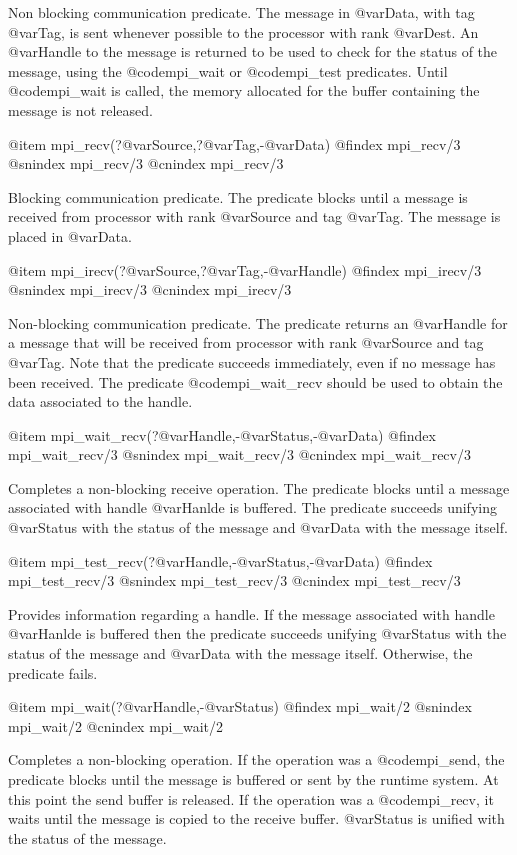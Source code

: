 {{{{{{{{{Non blocking communication predicate. The message in @var{Data}, with
tag @var{Tag}, is sent whenever possible to the processor with rank
@var{Dest}. An @var{Handle} to the message is returned to be used to
check for the status of the message, using the @code{mpi_wait} or
@code{mpi_test} predicates. Until @code{mpi_wait} is called, the
memory allocated for the buffer containing the message is not
released.

@item mpi_recv(?@var{Source},?@var{Tag},-@var{Data})
@findex mpi_recv/3
@snindex mpi_recv/3
@cnindex mpi_recv/3

Blocking communication predicate. The predicate blocks until a message
is received from processor with rank @var{Source} and tag @var{Tag}.
The message is placed in @var{Data}.

@item mpi_irecv(?@var{Source},?@var{Tag},-@var{Handle})
@findex mpi_irecv/3
@snindex mpi_irecv/3
@cnindex mpi_irecv/3

Non-blocking communication predicate. The predicate returns an
@var{Handle} for a message that will be received from processor with
rank @var{Source} and tag @var{Tag}. Note that the predicate succeeds
immediately, even if no message has been received. The predicate
@code{mpi_wait_recv} should be used to obtain the data associated to
the handle.

@item mpi_wait_recv(?@var{Handle},-@var{Status},-@var{Data})
@findex mpi_wait_recv/3
@snindex mpi_wait_recv/3
@cnindex mpi_wait_recv/3

Completes a non-blocking receive operation. The predicate blocks until
a message associated with handle @var{Hanlde} is buffered. The
predicate succeeds unifying @var{Status} with the status of the
message and @var{Data} with the message itself. 

@item mpi_test_recv(?@var{Handle},-@var{Status},-@var{Data})
@findex mpi_test_recv/3
@snindex mpi_test_recv/3
@cnindex mpi_test_recv/3

Provides information regarding a handle. If the message associated
with handle @var{Hanlde} is buffered then the predicate succeeds
unifying @var{Status} with the status of the message and @var{Data}
with the message itself. Otherwise, the predicate fails.


@item mpi_wait(?@var{Handle},-@var{Status})
@findex mpi_wait/2
@snindex mpi_wait/2
@cnindex mpi_wait/2

Completes a non-blocking operation. If the operation was a
@code{mpi_send}, the predicate blocks until the message is buffered
or sent by the runtime system. At this point the send buffer is
released. If the operation was a @code{mpi_recv}, it waits until the
message is copied to the receive buffer. @var{Status} is unified with
the status of the message.

}}}}}}}}}
